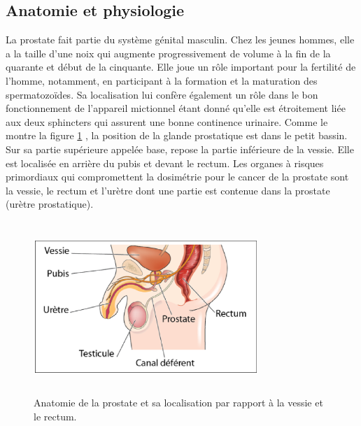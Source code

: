 \subsection{Anatomie et physiologie}
La prostate fait partie du système génital masculin. Chez les jeunes hommes, elle a la taille d’une noix qui augmente progressivement de volume à la fin de la quarante et début de la cinquante. Elle joue un rôle important pour la fertilité de l’homme, notamment, en participant à la formation et la maturation des spermatozoïdes. Sa localisation lui confère également un rôle dans le bon fonctionnement de l’appareil mictionnel étant donné qu’elle est étroitement liée aux deux sphincters qui assurent une bonne continence urinaire. Comme le montre la figure \ref{FigureProstate} \cite{ImageProstate}, la position de la glande prostatique est dans le petit bassin. Sur sa partie supérieure appelée base, repose la partie inférieure de la vessie. Elle est localisée en arrière du pubis et devant le rectum. Les organes à risques primordiaux qui compromettent la dosimétrie pour le cancer de la prostate sont la vessie, le rectum et l’urètre dont une partie est contenue dans la prostate (urètre prostatique).
%
\begin{figure}[ht]
\centering
\includegraphics[width=8.5cm,height=6.5cm]{FigureProstate.eps}
\caption{\label{FigureProstate} Anatomie de la prostate et sa localisation par rapport à la vessie et le rectum.}
\end{figure}
%
